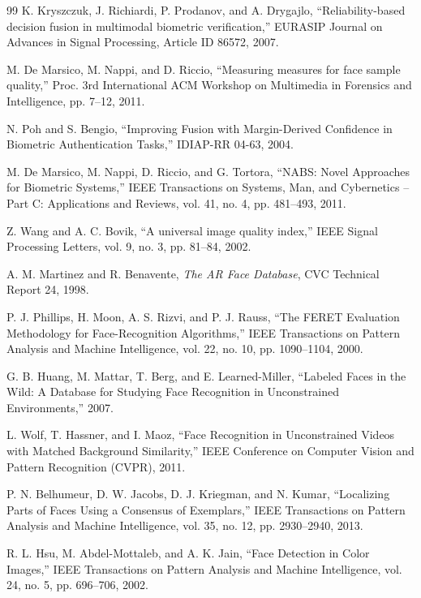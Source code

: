\documentclass[11pt,a4paper,oneside]{report}
\begin{document}
\begin{thebibliography}{99}
K. Kryszczuk, J. Richiardi, P. Prodanov, and A. Drygajlo,
``Reliability-based decision fusion in multimodal biometric verification,''
EURASIP Journal on Advances in Signal Processing, Article ID 86572, 2007.

M. De Marsico, M. Nappi, and D. Riccio,
``Measuring measures for face sample quality,'' Proc. 3rd International ACM
Workshop on Multimedia in Forensics and Intelligence, pp. 7--12, 2011.

N. Poh and S. Bengio,
``Improving Fusion with Margin-Derived Confidence in Biometric Authentication
Tasks,'' IDIAP-RR 04-63, 2004.

M. De Marsico, M. Nappi, D. Riccio, and G. Tortora,
``NABS: Novel Approaches for Biometric Systems,'' IEEE Transactions on Systems,
Man, and Cybernetics -- Part C: Applications and Reviews, vol. 41, no. 4,
pp. 481--493, 2011.


Z. Wang and A. C. Bovik,
``A universal image quality index,'' IEEE Signal Processing Letters,
vol. 9, no. 3, pp. 81--84, 2002.

A. M. Martinez and R. Benavente,
\emph{The AR Face Database}, CVC Technical Report 24, 1998.

P. J. Phillips, H. Moon, A. S. Rizvi, and P. J. Rauss,
``The FERET Evaluation Methodology for Face-Recognition Algorithms,''
IEEE Transactions on Pattern Analysis and Machine Intelligence,
vol. 22, no. 10, pp. 1090--1104, 2000.

G. B. Huang, M. Mattar, T. Berg, and E. Learned-Miller,
``Labeled Faces in the Wild: A Database for Studying Face Recognition in
Unconstrained Environments,'' 2007.

L. Wolf, T. Hassner, and I. Maoz,
``Face Recognition in Unconstrained Videos with Matched Background Similarity,''
IEEE Conference on Computer Vision and Pattern Recognition (CVPR), 2011.

P. N. Belhumeur, D. W. Jacobs, D. J. Kriegman, and N. Kumar,
``Localizing Parts of Faces Using a Consensus of Exemplars,''
IEEE Transactions on Pattern Analysis and Machine Intelligence,
vol. 35, no. 12, pp. 2930--2940, 2013.

R. L. Hsu, M. Abdel-Mottaleb, and A. K. Jain,
``Face Detection in Color Images,''
IEEE Transactions on Pattern Analysis and Machine Intelligence,
vol. 24, no. 5, pp. 696--706, 2002.


\end{thebibliography}
\end{document}
